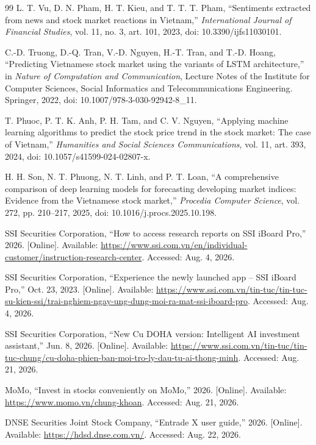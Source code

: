 \documentclass[12pt,a4paper,oneside]{report}
\begin{document}
\begin{thebibliography}{99}
L. T. Vu, D. N. Pham, H. T. Kieu, and T. T. T. Pham, ``Sentiments extracted from news and stock market reactions in Vietnam,'' \textit{International Journal of Financial Studies}, vol. 11, no. 3, art. 101, 2023, doi: 10.3390/ijfs11030101.

C.-D. Truong, D.-Q. Tran, V.-D. Nguyen, H.-T. Tran, and T.-D. Hoang, ``Predicting Vietnamese stock market using the variants of LSTM architecture,'' in \textit{Nature of Computation and Communication}, Lecture Notes of the Institute for Computer Sciences, Social Informatics and Telecommunications Engineering. Springer, 2022, doi: 10.1007/978-3-030-92942-8\_11.

T. Phuoc, P. T. K. Anh, P. H. Tam, and C. V. Nguyen, ``Applying machine learning algorithms to predict the stock price trend in the stock market: The case of Vietnam,'' \textit{Humanities and Social Sciences Communications}, vol. 11, art. 393, 2024, doi: 10.1057/s41599-024-02807-x.

H. H. Son, N. T. Phuong, N. T. Linh, and P. T. Loan, ``A comprehensive comparison of deep learning models for forecasting developing market indices: Evidence from the Vietnamese stock market,'' \textit{Procedia Computer Science}, vol. 272, pp. 210--217, 2025, doi: 10.1016/j.procs.2025.10.198.

SSI Securities Corporation, ``How to access research reports on SSI iBoard Pro,'' 2026. [Online]. Available: \url{https://www.ssi.com.vn/en/individual-customer/instruction-research-center}. Accessed: Aug. 4, 2026.

SSI Securities Corporation, ``Experience the newly launched app -- SSI iBoard Pro,'' Oct. 23, 2023. [Online]. Available: \url{https://www.ssi.com.vn/tin-tuc/tin-tuc-su-kien-ssi/trai-nghiem-ngay-ung-dung-moi-ra-mat-ssi-iboard-pro}. Accessed: Aug. 4, 2026.

SSI Securities Corporation, ``New Cu DOHA version: Intelligent AI investment assistant,'' Jun. 8, 2026. [Online]. Available: \url{https://www.ssi.com.vn/tin-tuc/tin-tuc-chung/cu-doha-phien-ban-moi-tro-ly-dau-tu-ai-thong-minh}. Accessed: Aug. 21, 2026.

MoMo, ``Invest in stocks conveniently on MoMo,'' 2026. [Online]. Available: \url{https://www.momo.vn/chung-khoan}. Accessed: Aug. 21, 2026.

DNSE Securities Joint Stock Company, ``Entrade X user guide,'' 2026. [Online]. Available: \url{https://hdsd.dnse.com.vn/}. Accessed: Aug. 22, 2026.


\end{thebibliography}
\end{document}
